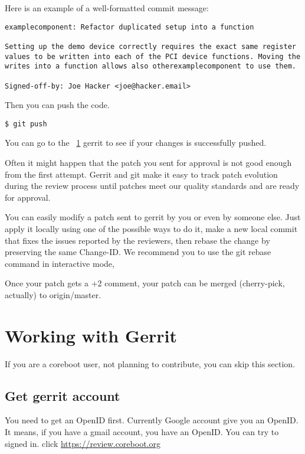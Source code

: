 \documentclass[titlepage,12pt]{article}
\begin{document}
{Here is an example of a well-formatted commit message:

{ \small
\begin{verbatim}
examplecomponent: Refactor duplicated setup into a function

Setting up the demo device correctly requires the exact same register
values to be written into each of the PCI device functions. Moving the
writes into a function allows also otherexamplecomponent to use them.

Signed-off-by: Joe Hacker <joe@hacker.email>
\end{verbatim}
}

Then you can push the code.
{ \small
\begin{verbatim}
$ git push
\end{verbatim}
}

You can go to the ~\ref{sec:gerrit} gerrit to see if your changes is successfully pushed.

Often it might happen that the patch you sent for approval is not good
enough from the first attempt. Gerrit and git make it easy to track
patch evolution during the review process until patches meet our
quality standards and are ready for approval.

You can easily modify a patch sent to gerrit by you or even by someone
else. Just apply it locally using one of the possible ways to do it,
make a new local commit that fixes the issues reported by the
reviewers, then rebase the change by preserving the same Change-ID. We
recommend you to use the git rebase command in interactive mode,

Once your patch gets a +2 comment, your patch can be merged (cherry-pick, actually) to origin/master.

%
%

\section{Working with Gerrit}
\label{sec:gerrit}
If you are a coreboot user, not planning to contribute, you can skip this section.
\subsection{Get gerrit account}
You need to get an OpenID first. Currently Google account give you an OpenID. It means, if you have a gmail account, you have an OpenID. You can try to signed in.
click \url{https://review.coreboot.org}

}
\end{document}
